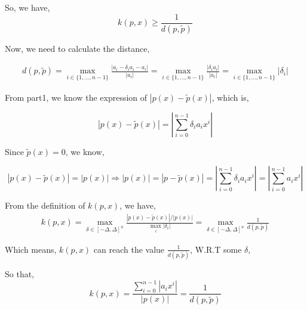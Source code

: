 \documentclass{article}
\def\implies{\Longrightarrow}
\begin{document}
So, we have,
$$k(p, x) \ge \frac{1}{d(p, \tilde p)}$$

Now, we need to calculate the distance,

\[
\begin{split}
d(p, \tilde{p}) = \max \limits_{i \in {\{1, ..., n -1\}}} \frac{|a_i - \delta_ia_i - a_i|}{|a_i|} =  \max \limits_{i \in {\{1, ..., n -1\}}} \frac{|\delta_ia_i|}{|a_i|} =  \max \limits_{i \in {\{1, ..., n -1\}}} |\delta_i|
\end{split}
\]

From part1, we know the expression of $|p(x) - \tilde{p}(x)|$, which is,

$$|p(x) - \tilde{p}(x)| =|\sum \limits_{i=0}^{n-1} \delta_ia_ix^i| $$

Since $\tilde{p}(x) = 0$, we know,

$$|p(x) - \tilde{p}(x)| = |p(x)| \implies |p(x)| = |p - \tilde p(x)| =  |\sum \limits_{i=0}^{n-1} \delta_ia_ix^i| = |\sum \limits_{i=0}^{n-1} a_ix^i| $$

From the definition of $k(p, x)$, we have, 
\[
\begin{split}
k(p, x) = \max \limits_{\delta \in [-\Delta, \Delta]^n} \frac{|p(x) - \tilde{p}(x)| / |p(x)|}{\max_i |\delta_i|} = \max \limits_{\delta \in [-\Delta, \Delta]^n} \frac{1}{d(p, \tilde p)}
\end{split}
\]

Which means, $k(p, x)$ can reach the value $\frac{1}{d(p, \tilde p)}$, W.R.T some $\delta$,

So that, $$k(p, x) = \frac{\sum \limits_{i = 0}^{n-1}|a_ix^i|}{|p(x)|} = \frac{1}{d(p, \tilde p)}$$



\end{document}
